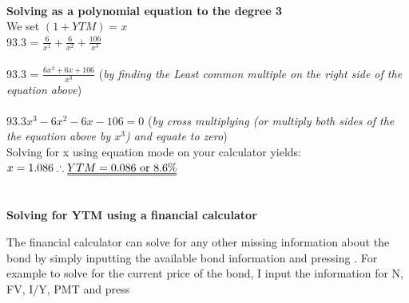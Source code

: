 \documentclass[12]{article}
\begin{document}
\noindent
\\
\textbf{Solving as a polynomial equation to the degree 3}\\
We set $(1 + YTM) = x$\\
{93.3 = \Large $\frac{6}{x^1} + \frac{6}{x^2} + \frac{106}{x^3}$}  \\
\\
{93.3 = \Large $\frac{6x^2 + 6x + 106}{x^3}$}  \hspace{4mm}  {\small(\textit{by finding the Least common multiple on the right side of the equation above})}\\
\\
{$93.3x^3 - 6x^2 -6x -106 = 0$} \hspace{4mm}  {\small(\textit{by cross multiplying (or multiply both sides of the the equation above by $x^3$) and equate to zero})}\\
Solving for x using equation mode on your calculator yields:\\
$ x = 1.086 \therefore \uuline{YTM = 0.086 \text{ or } 8.6\%}$

\noindent
\\
\textbf{Solving for YTM using a financial calculator}\\
\begin{table}[H]
    \centering
    \label{tab:my_label}
\end{table}
The financial calculator can solve for any other missing information about the bond by simply inputting the available bond information and pressing . For example to solve for the current price of the bond, I input the information for N, FV, I/Y, PMT and press \\
\end{document}
